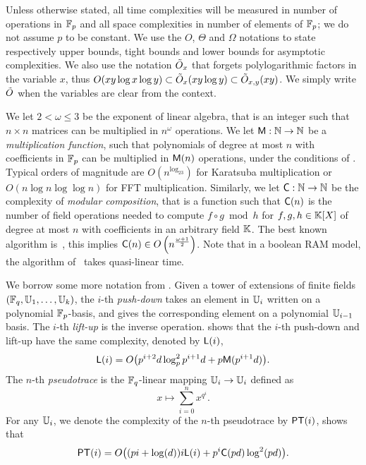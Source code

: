 Unless otherwise stated, all time complexities will be measured in
number of operations in $\mathbb{F}_p$ and all space complexities in number of
elements of $\mathbb{F}_p$; we do not assume $p$ to be constant. We use the
$O$, $\Theta$ and $\Omega$ notations to state respectively upper
bounds, tight bounds and lower bounds for asymptotic complexities. We
also use the notation $\tilde{O}_x$ that forgets polylogarithmic factors
in the variable $x$, thus $O(xy\log x \log y)\subset\tilde{O}_x(xy\log
y)\subset\tilde{O}_{x,y}(xy)$. We simply write $\tilde{O}$ when the variables
are clear from the context.

We let $2<\omega\le3$ be the exponent of linear algebra, that is an
integer such that $n\times n$ matrices can be multiplied in $n^\omega$
operations. We let $\mathrm{\sf M}:\mathbb{N}\rightarrow\mathbb{N}$ be a \emph{multiplication
  function}, such that polynomials of degree at most $n$ with
coefficients in $\mathbb{F}_p$ can be multiplied in $\mathrm{\sf M}(n)$ operations,
under the conditions of \cite[Ch. 8.3]{vzGG}. Typical orders of
magnitude are $O(n^{\log_23})$ for Karatsuba multiplication or
$O(n\log n\log\log n)$ for FFT multiplication. Similarly, we let
$\mathrm{\sf C}:\mathbb{N}\rightarrow\mathbb{N}$ be the complexity of \emph{modular
  composition}, that is a function such that $\mathrm{\sf C}(n)$ is the
number of field operations needed to compute $f\circ g\bmod h$ for
$f,g,h\in\mathbb{K}[X]$ of degree at most $n$ with coefficients in an
arbitrary field $\mathbb{K}$. The best known algorithm is~\cite{BrKu78}, this
implies $\mathrm{\sf C}(n)\in O\left(n^{\frac{\omega+1}{2}}\right)$. Note
that in a boolean RAM model, the algorithm of~\cite{KeUm08} takes
quasi-linear time.

We borrow some more notation from \cite{DFS09}. Given a tower of
extensions of finite fields $(\mathbb{F}_q,\mathbb{U}_1,\ldots,\mathbb{U}_k)$, the $i$-th
\emph{push-down} takes an element in $\mathbb{U}_i$ written on a polynomial
$\mathbb{F}_p$-basis, and gives the corresponding element on a polynomial
$\mathbb{U}_{i-1}$ basis. The $i$-th \emph{lift-up} is the inverse
operation. \cite[Th. 13]{DFS09} shows that the $i$-th push-down
and lift-up have the same complexity, denoted by ${\sf L}(i)$,
\[{\sf L}(i) = O\bigl(p^{i+2}d\log_p^2{p^{i+1}d} +
p\mathrm{\sf M}(p^{i+1}d)\bigr) \text{.}\] 
The $n$-th \emph{pseudotrace} is the
$\mathbb{F}_q$-linear mapping $\mathbb{U}_i\rightarrow\mathbb{U}_i$ defined as
\begin{equation*}
  x\mapsto\sum_{i=0}^{n}x^{q^i}
  \text{.}
\end{equation*}
For any $\mathbb{U}_i$, we denote the complexity of the $n$-th pseudotrace by
${\sf PT}(i)$, \cite[Th. 20]{DFS09} shows that
\[{\sf PT}(i) = O\bigl((pi + \log(d))i{\sf L}(i) + p^i\mathrm{\sf C}(pd)\log^2(pd)\bigr)\text{.}\]



